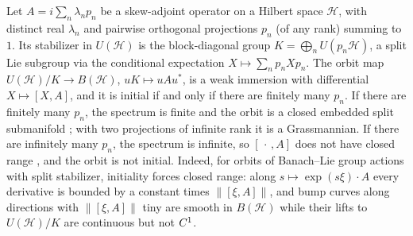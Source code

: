 \begin{remark}
  \label{rem:sub-unitary-orbits}
  Let $A = i\sum_n \lambda_n p_n$ be a skew-adjoint operator on a Hilbert space $\mathcal{H}$,
  with distinct real $\lambda_n$ and pairwise orthogonal projections $p_n$ (of any rank) summing
  to $1$. Its stabilizer in $U(\mathcal{H})$ is the block-diagonal group
  $K = \bigoplus_n U(p_n\mathcal{H})$, a split Lie subgroup via the conditional expectation
  $X \mapsto \sum_n p_n X p_n$. The orbit map $U(\mathcal{H})/K \to B(\mathcal{H})$,
  $uK \mapsto uAu^*$, is a weak immersion with differential $X \mapsto [X, A]$, and it is
  initial if and only if there are finitely many $p_n$.
  If there are finitely many $p_n$, the spectrum is finite and the orbit is a closed embedded
  split submanifold \cite{BL23}; with two projections of infinite rank it is a Grassmannian.
  If there are infinitely many $p_n$, the spectrum is infinite, so $[\,\cdot\,, A]$ does not
  have closed range \cite{BL23}, and the orbit is not initial. Indeed, for orbits of Banach--Lie
  group actions with split stabilizer, initiality forces closed range: along
  $s \mapsto \exp(s\xi)\cdot A$ every derivative is bounded by a constant times
  $\|[\xi, A]\|$, and bump curves along directions with $\|[\xi, A]\|$ tiny are smooth in
  $B(\mathcal{H})$ while their lifts to $U(\mathcal{H})/K$ are continuous but not $C^{1}$.
\end{remark}

